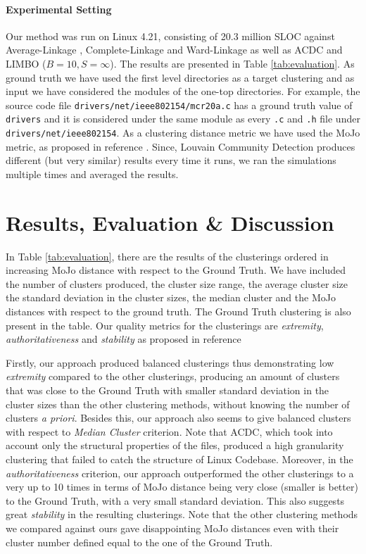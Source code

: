 \documentclass[sigconf,review, anonymous]{acmart}
\begin{document}
\paragraph{Experimental Setting} Our method was run on Linux 4.21,
consisting of 20.3 million SLOC against Average-Linkage \cite{average}, Complete-Linkage \cite{complete} 
and Ward-Linkage \cite{ward} as well as ACDC and LIMBO ($B = 10, S = \infty$). The results are presented in Table \ref{tab:evaluation}. 
As ground truth we have used the first level directories as a target clustering and as input we have considered 
the modules of the one-top directories. 
For example, the source code file \texttt{drivers/net/ieee802154\-/mcr20a.c} has a ground truth value of \texttt{drivers} 
and it is considered under the same module as every \texttt{.c} and \texttt{.h} file under \texttt{drivers/net/ieee802154}. 
As a clustering distance metric we have used the MoJo metric, as proposed in reference \cite{mojo}. 
Since, Louvain Community Detection produces  different (but very similar) results every time it runs, we ran the simulations 
multiple times and averaged the results. 

\section{Results, Evaluation \& Discussion}

In Table \ref{tab:evaluation}, there are the results of the clusterings ordered in increasing MoJo distance 
with respect to the Ground Truth. 
We have included the number of clusters produced, the cluster size range, the average cluster size the standard
deviation in the cluster sizes, the median cluster and the MoJo distances with respect to the ground truth. 
The Ground Truth clustering is also present in the table. 
Our quality metrics for the clusterings are 
\emph{extremity}, \emph{authoritativeness} and \emph{stability} as proposed in reference \cite{evaluation}

Firstly, our approach produced balanced clusterings thus demonstrating low \emph{extremity} compared to the other clusterings, 
producing an amount of clusters that was close to the Ground Truth with smaller standard deviation in the cluster sizes than 
the other clustering methods, without knowing the number of clusters \emph{a priori}. 
Besides this, our approach also seems to give balanced clusters with respect to \emph{Median Cluster} criterion. 
Note that ACDC, which took into account only the structural properties of the files, produced a high 
granularity clustering that failed to catch the structure of Linux Codebase. 
Moreover, in the \emph{authoritativeness} criterion, our approach outperformed the other clusterings to a very up to 10 times 
in terms of MoJo distance being very close (smaller is better) to the Ground Truth, with a very small standard deviation. 
This also suggests great \emph{stability} in the resulting clusterings. 
Note that the other clustering methods we compared against ours gave disappointing MoJo distances even with their cluster
number defined equal to the one of the Ground Truth. 
\end{document}
